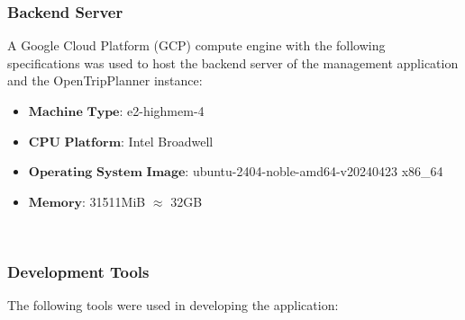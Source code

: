 \documentclass[journal]{./IEEE/IEEEtran}
\begin{document}
\subsubsection{\textbf{Backend Server}}
A Google Cloud Platform (GCP) compute engine with the following specifications was used to host the backend server of the management application and the OpenTripPlanner instance:
\begin{itemize}
    \item $\textbf{Machine Type:}$  e2-highmem-4
    \item $\textbf{CPU Platform:}$ Intel Broadwell
    \item $\textbf{Operating System Image:}$ ubuntu-2404-noble-amd64-v20240423 x86\_64
    \item $\textbf{Memory:}$ 31511MiB $\approx$ 32GB
\end{itemize} \hfill \
\hfill

\subsubsection{\textbf{Development Tools}}
The following tools were used in developing the application:
\end{document}
